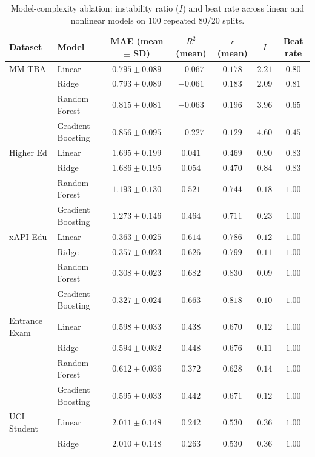 \documentclass[10pt,letterpaper]{article}
\begin{document}
\begin{table}[!h]
\centering
\caption{Model-complexity ablation: instability ratio ($I$) and beat rate across linear and nonlinear models on 100 repeated 80/20 splits.}
\label{tab:model_complexity}
\small
\begin{tabular}{l l c c c c c}
\toprule
Dataset & Model & MAE (mean $\pm$ SD) & $R^2$ (mean) & $r$ (mean) & $I$ & Beat rate \\
\midrule
MM-TBA & Linear & $0.795 \pm 0.089$ & $-0.067$ & $0.178$ & $2.21$ & $0.80$ \\
 & Ridge & $0.793 \pm 0.089$ & $-0.061$ & $0.183$ & $2.09$ & $0.81$ \\
 & Random Forest & $0.815 \pm 0.081$ & $-0.063$ & $0.196$ & $3.96$ & $0.65$ \\
 & Gradient Boosting & $0.856 \pm 0.095$ & $-0.227$ & $0.129$ & $4.60$ & $0.45$ \\
\midrule
Higher Ed & Linear & $1.695 \pm 0.199$ & $0.041$ & $0.469$ & $0.90$ & $0.83$ \\
 & Ridge & $1.686 \pm 0.195$ & $0.054$ & $0.470$ & $0.84$ & $0.83$ \\
 & Random Forest & $1.193 \pm 0.130$ & $0.521$ & $0.744$ & $0.18$ & $1.00$ \\
 & Gradient Boosting & $1.273 \pm 0.146$ & $0.464$ & $0.711$ & $0.23$ & $1.00$ \\
\midrule
xAPI-Edu & Linear & $0.363 \pm 0.025$ & $0.614$ & $0.786$ & $0.12$ & $1.00$ \\
 & Ridge & $0.357 \pm 0.023$ & $0.626$ & $0.799$ & $0.11$ & $1.00$ \\
 & Random Forest & $0.308 \pm 0.023$ & $0.682$ & $0.830$ & $0.09$ & $1.00$ \\
 & Gradient Boosting & $0.327 \pm 0.024$ & $0.663$ & $0.818$ & $0.10$ & $1.00$ \\
\midrule
Entrance Exam & Linear & $0.598 \pm 0.033$ & $0.438$ & $0.670$ & $0.12$ & $1.00$ \\
 & Ridge & $0.594 \pm 0.032$ & $0.448$ & $0.676$ & $0.11$ & $1.00$ \\
 & Random Forest & $0.612 \pm 0.036$ & $0.372$ & $0.628$ & $0.14$ & $1.00$ \\
 & Gradient Boosting & $0.595 \pm 0.033$ & $0.442$ & $0.671$ & $0.12$ & $1.00$ \\
\midrule
UCI Student & Linear & $2.011 \pm 0.148$ & $0.242$ & $0.530$ & $0.36$ & $1.00$ \\
 & Ridge & $2.010 \pm 0.148$ & $0.263$ & $0.530$ & $0.36$ & $1.00$ \\

\end{tabular}
\end{table}
\end{document}
